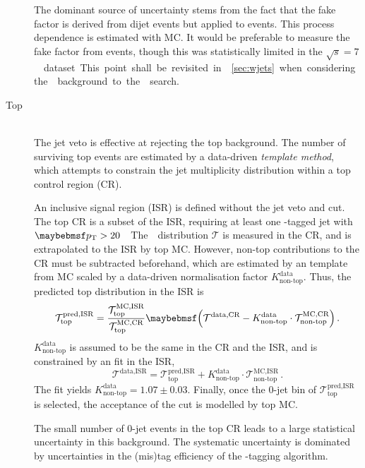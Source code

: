 \begin{description}
	The dominant source of uncertainty stems from the fact that the fake factor is 
	derived from dijet events but applied to \Wjets events. This process dependence is 
	estimated with MC. It would be preferable to measure the fake factor from \Zjets 
	events, though this was statistically limited in the \unit{$\sqrt{s} = 7$}{\TeV} 
	dataset. This point shall be revisited in \Section~\ref{sec:wjets} when considering 
	the \Wjets background to the \HWW search.

\item[Top] \hfill \\
	The jet veto is effective at rejecting the top background. The number of surviving 
	top events are estimated by a data-driven \textit{template method}, which attempts to 
	constrain the jet multiplicity distribution within a top control region (CR).

	An inclusive signal region (ISR) is defined without the jet veto and \ptll cut. The 
	top CR is a subset of the ISR, requiring at least one \Pbottom-tagged jet with 
	\unit{$\pt > 20$}{\GeV}. The \njets distribution $\mathcal{T}$ is measured in the CR, 
	and is extrapolated to the ISR by top MC. However, non-top contributions to the CR 
	must be subtracted beforehand, which are estimated by an \njets template from MC 
	scaled by a data-driven normalisation factor $K_{\text{non-top}}^{\text{data}}$. 
	Thus, the predicted top \njets distribution in the ISR is
	\begin{equation}
		\mathcal{T}_{\text{top}}^{\text{pred,ISR}} = \frac{\mathcal{T}_{\text{top}}^{\text{MC,ISR}}}{\mathcal{T}_{\text{top}}^{\text{MC,CR}}} \parenths{\mathcal{T}^{\text{data,CR}} - K_{\text{non-top}}^{\text{data}} \cdot \mathcal{T}_{\text{non-top}}^{\text{MC,CR}}} \,.
	\end{equation}
	$K_{\text{non-top}}^{\text{data}}$ is assumed to be the same in the CR and the ISR, 
	and is constrained by an \njets fit in the ISR, \ie
	\begin{equation}
		\mathcal{T}^{\text{data,ISR}} = \mathcal{T}_{\text{top}}^{\text{pred,ISR}} + K_{\text{non-top}}^{\text{data}} \cdot \mathcal{T}_{\text{non-top}}^{\text{MC,ISR}} \,.
	\end{equation}
	The fit yields $K_{\text{non-top}}^{\text{data}} = 1.07 \pm 0.03$.
	Finally, once the 0-jet bin of $\mathcal{T}_{\text{top}}^{\text{pred,ISR}}$ is 
	selected, the acceptance of the \ptll cut is modelled by top MC.

	The small number of 0-jet events in the top CR leads to a large statistical 
	uncertainty in this background. The systematic uncertainty is dominated by 
	uncertainties in the (mis)tag efficiency of the \Pbottom-tagging algorithm.


\end{description}
